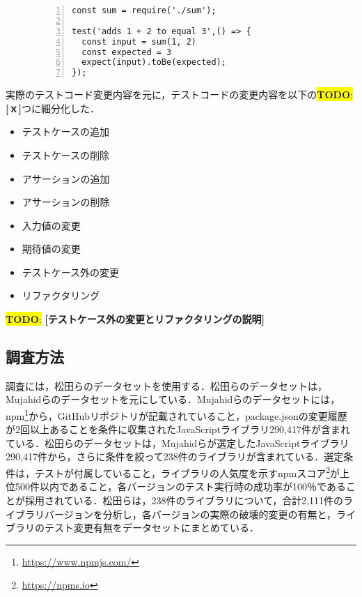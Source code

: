\documentclass[T,J]{fose} %
\newcommand{\todo}[1]{\colorbox{yellow}{{\bf TODO}:}{\color{red} {\textbf{[#1]}}}}
\begin{document}
\begin{figure}[t]
    \begin{lstlisting}[caption={[upper/lower text]%
               \begin{tabular}[t]{@{}l@{}}
                test/sum.test.js \\[1.0\normalbaselineskip]
               \end{tabular}},frame={tb},numbers=left,label=testSample,identifierstyle={\small}]
const sum = require('./sum');

test('adds 1 + 2 to equal 3',() => {
  const input = sum(1, 2)
  const expected = 3
  expect(input).toBe(expected);
});
\end{lstlisting}
\vspace{-6mm}
\end{figure}

実際のテストコード変更内容を元に，テストコードの変更内容を以下の\todo{ｘ}つに細分化した．

\begin{itemize}
    \item テストケースの追加
    \item テストケースの削除
    \item アサーションの追加
    \item アサーションの削除
    \item 入力値の変更
    \item 期待値の変更
    \item テストケース外の変更
    \item リファクタリング
\end{itemize}

\todo{テストケース外の変更とリファクタリングの説明}

\subsection{調査方法}
調査には，松田らのデータセット\cite{maekawa_matsuda}を使用する．松田らのデータセットは，Mujahidらのデータセットを元にしている．Mujahidらのデータセットには，npm\footnote{\url{https://www.npmjs.com/}}から，GitHubリポジトリが記載されていること，package.jsonの変更履歴が2回以上あることを条件に収集されたJavaScriptライブラリ290,417件が含まれている．松田らのデータセットは，Mujahidらが選定したJavaScriptライブラリ290,417件から，さらに条件を絞って238件のライブラリが含まれている．選定条件は，テストが付属していること，ライブラリの人気度を示すnpmスコア\footnote{\url{https://npms.io}}が上位500件以内であること，各バージョンのテスト実行時の成功率が100％であることが採用されている．松田らは，238件のライブラリについて，合計2,111件のライブラリバージョンを分析し，各バージョンの実際の破壊的変更の有無と，ライブラリのテスト変更有無をデータセットにまとめている．
\end{document}
